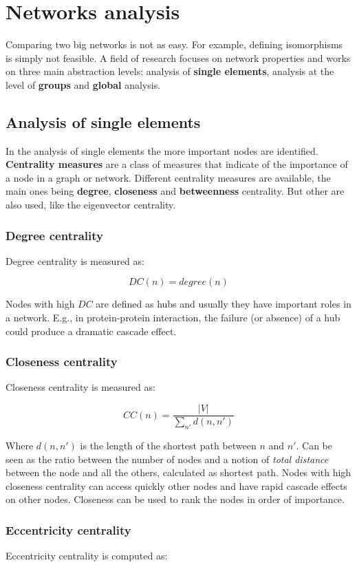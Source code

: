 \section{Networks analysis}
Comparing two big networks is not as easy. For example, defining isomorphisms is simply not feasible.
A field of research focuses on network properties and works on three main abstraction levels: analysis of \textbf{single elements}, analysis at the level of \textbf{groups} and \textbf{global} analysis.

	\subsection{Analysis of single elements}
	In the analysis of single elements the more important nodes are identified.
	\textbf{Centrality measures} are a class of measures that indicate of the importance of a node in a graph or network.
	Different centrality measures are available, the main ones being \textbf{degree}, \textbf{closeness} and \textbf{betweenness} centrality.
	But other are also used, like the eigenvector centrality.

		\subsubsection{Degree centrality}
		Degree centrality is measured as:

		$$DC(n) = degree(n)$$

		Nodes with high $DC$ are defined as hubs and usually they have important roles in a network.
E.g., in protein-protein interaction, the failure (or absence) of a hub could produce a dramatic cascade effect.

		\subsubsection{Closeness centrality}
		Closeness centrality is measured as:

		$$CC(n) = \frac{|V|}{\sum\limits_{n'}d(n,n')}$$

		Where $d(n,n')$ is the length of the shortest path between $n$ and $n'$.
		Can be seen as the ratio between the number of nodes and a notion of \textit{total distance} between the node and all the others, calculated as shortest path.
		Nodes with high closeness centrality can access quickly other nodes and have rapid cascade effects on other nodes.
		Closeness can be used to rank the nodes in order of importance.

		\subsubsection{Eccentricity centrality}
		Eccentricity centrality is computed as:

